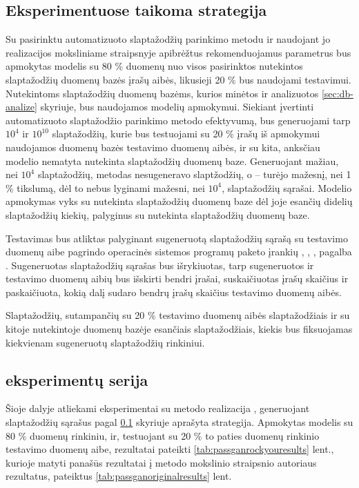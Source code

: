 \documentclass{VUMIFInfBakalaurinis}
\begin{document}
\subsection{Eksperimentuose taikoma strategija} \label{sec:strategy}
Su pasirinktu automatizuoto slaptažodžių parinkimo metodu ir naudojant jo 
realizacijos moksliniame straipsnyje apibrėžtus rekomenduojamus parametrus bus 
apmokytas modelis su 80 \% duomenų nuo visos pasirinktos nutekintos slaptažodžių 
duomenų bazės įrašų aibės, likusieji 20 \% bus naudojami testavimui. Nutekintoms 
slaptažodžių duomenų bazėms, kurios minėtos ir analizuotos \ref{sec:db-analize} 
skyriuje, bus naudojamos modelių apmokymui. Siekiant įvertinti automatizuoto 
slaptažodžio parinkimo metodo efektyvumą, bus generuojami tarp $10^{4}$ ir 
$10^{10}$ slaptažodžių, kurie bus testuojami su 20 \% įrašų iš apmokymui 
naudojamos duomenų bazės testavimo duomenų aibės, ir su kita, anksčiau modelio 
nematyta nutekinta slaptažodžių duomenų baze. Generuojant mažiau, nei $10^{4}$ 
slaptažodžių,  metodas nesugeneravo slaptžodžių, o 
 -- turėjo mažesnį, nei 1 \% tikslumą, dėl to nebus lyginami 
mažesni, nei $10^{4}$, slaptažodžių sąrašai. Modelio apmokymas vyks su 
 nutekinta slaptažodžių duomenų baze dėl joje esančių didelių 
slaptažodžių kiekių, palyginus su  nutekinta slaptažodžių 
duomenų baze.

Testavimas bus atliktas palyginant sugeneruotą slaptažodžių sąrašą su testavimo 
duomenų aibe  pagrindo operacinės sistemos programų paketo 
 įrankių , 
, ,  pagalba \cite{Coreutils}. 
Sugeneruotas slaptažodžių sąrašas bus išrykiuotas, tarp sugeneruotos ir 
testavimo duomenų aibių bus išskirti bendri įrašai, suskaičiuotas įrašų skaičius 
ir paskaičiuota, kokią dalį sudaro bendrų įrašų skaičius testavimo duomenų 
aibės.

Slaptažodžių, sutampančių su 20 \% testavimo duomenų aibės slaptažodžiais ir su 
kitoje nutekintoje duomenų bazėje esančiais slaptažodžiais, kiekis bus 
fiksuojamas kiekvienam sugeneruotų slaptažodžių rinkiniui.

\subsection{ eksperimentų serija}
Šioje dalyje atliekami eksperimentai su  metodo realizacija 
\cite{PassGAN:impl}, generuojant slaptažodžių sąrašus pagal \ref{sec:strategy} 
skyriuje aprašyta strategija. Apmokytas modelis su 80 \%  
duomenų rinkiniu, ir, testuojant su 20 \% to paties duomenų rinkinio testavimo 
duomenų aibe, rezultatai pateikti \ref{tab:passganrockyouresults} lent., kurioje 
matyti panašūs rezultatai į  metodo mokslinio straipsnio 
autoriaus rezultatus, pateiktus \ref{tab:passganoriginalresults} lent.
\end{document}
